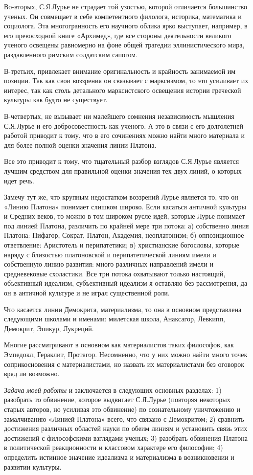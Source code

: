 Во-вторых, С.Я.Лурье не страдает той узостью, которой отличается
большинство ученых. Он совмещает в себе компетентного филолога,
историка, математика и социолога. Эта многогранность его научного
облика ярко выступает, например, в его превосходной книге «Архимед»,
где все стороны деятельности великого ученого освещены равномерно на
фоне общей трагедии эллинистического мира, раздавленного римским
солдатским сапогом.

В-третьих, привлекает внимание оригинальность и крайность занимаемой
им позиции. Так как свои воззрения он связывает с марксизмом, то это
усиливает их интерес, так как столь детального марксистского освещения
истории греческой культуры как будто не существует.

В-четвертых, не вызывает ни малейшего сомнения независимость мышления
С.Я.Лурье и его добросовестность как ученого. А это в связи с его
долголетней работой приводит к тому, что в его сочинениях можно найти
много материала и для более полной оценки значения линии Платона.

Все это приводит к тому, что тщательный разбор взглядов С.Я.Лурье
является лучшим средством для правильной оценки значения тех двух
линий, о которых идет речь.

Замечу тут же, что крупным недостатком воззрений Лурье является то,
что он «Линию Платона» понимает слишком широко. Если касаться античной
культуры и Средних веков, то можно в том широком русле идей, которые
Лурье понимает под линией Платона, различить по крайней мере три
потока: а) собственно линия Платона: Пифагор, Сократ, Платон,
Академия, неоплатонизм; б) оппозиционное ответвление: Аристотель и
перипатетики; в) христианские богословы, которые наряду с близостью
платоновской и перипатетической линиям имели и собственную линию
развития: много различных направлений имели и средневековые
схоластики. Все три потока охватывают только настоящий, объективный
идеализм, субъективный идеализм я оставляю без рассмотрения, да он в
античной культуре и не играл существенной роли.

Что касается линии Демокрита, материализма, то она в основном
представлена следующими школами и именами: милетская школа, Анаксагор,
Левкипп, Демокрит, Эпикур, Лукреций.

Многие рассматривают в основном как материалистов таких философов, как
Эмпедокл, Гераклит, Протагор. Несомненно, что у них можно найти много
точек соприкосновения с материалистами, но назвать их материалистами
без оговорок вряд ли возможно.

\textit{Задача моей работы} и заключается в следующих основных
разделах: 1) разобрать то обвинение, которое выдвигает С.Я.Лурье
(повторяя некоторых старых авторов, но усиливая это обвинение) по
сознательному уничтожению и замалчиванию «Линией Платона» всего, что
связано с Демокритом; 2) сравнить достижения различных областей науки
по обеим линиям и установить связь этих достижений с философскими
взглядами ученых; 3) разобрать обвинения Платона в политической
реакционности и классовом характере его философии; 4) определить
истинное значение идеализма и материализма в возникновении и развитии
культуры.


